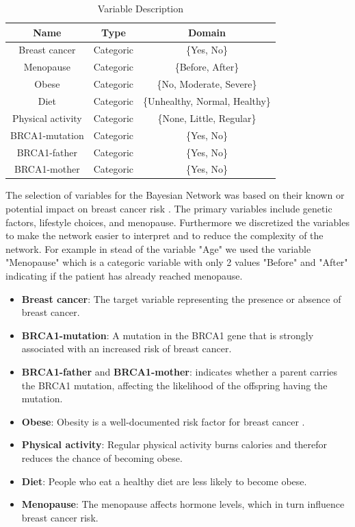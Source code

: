 \documentclass{article}
\begin{document}
\begin{table}[H]
    \centering
    \caption{Variable Description}
    \label{tab:variables}
    \begin{tabular}{|c|c|c|}
        \hline
        \textbf{Name} & \textbf{Type} & \textbf{Domain} \\
        \hline
        Breast cancer & Categoric & \{Yes, No\} \\
        Menopause & Categoric & \{Before, After\} \\
        Obese & Categoric & \{No, Moderate, Severe\} \\
        Diet & Categoric & \{Unhealthy, Normal, Healthy\} \\
        Physical activity & Categoric & \{None, Little, Regular\} \\
        BRCA1-mutation & Categoric & \{Yes, No\} \\
        BRCA1-father & Categoric & \{Yes, No\} \\
        BRCA1-mother & Categoric & \{Yes, No\} \\
        \hline
    \end{tabular}
\end{table}

The selection of variables for the Bayesian Network was based on their known or potential impact on breast cancer risk \cite{cancergov} \cite{komen}. The primary variables include genetic factors,
 lifestyle choices, and menopause. Furthermore we discretized the variables to make the network easier to interpret and to reduce the complexity of the network. For example in stead of the variable "Age" we used the variable "Menopause" which is a categoric variable with only 2 values "Before" and "After" indicating if the patient has already reached menopause.

\begin{itemize}
    \item \textbf{Breast cancer}: The target variable representing the presence or absence of breast cancer.
    \item \textbf{BRCA1-mutation}: A mutation in the BRCA1 gene that is strongly associated with an increased risk of breast cancer.
    \item \textbf{BRCA1-father} and \textbf{BRCA1-mother}: indicates whether a parent carries the BRCA1 mutation, affecting the likelihood of the offspring having the mutation.
    \item \textbf{Obese}: Obesity is a well-documented risk factor for breast cancer \cite{komen}.
    \item \textbf{Physical activity}: Regular physical activity burns calories and therefor reduces the chance of becoming obese.
    \item \textbf{Diet}: People who eat a healthy diet are less likely to become obese.
    \item \textbf{Menopause}: The menopause affects hormone levels, which in turn influence breast cancer risk. \cite{surakasula2014comparative}
\end{itemize}
\end{document}
